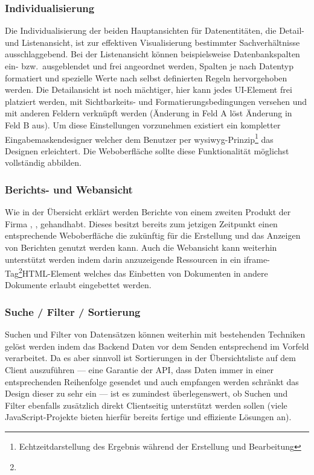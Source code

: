\subsubsection{Individualisierung}
Die Individualisierung der beiden Hauptansichten für Datenentitäten, die Detail- und Listenansicht, ist zur effektiven Visualisierung bestimmter Sachverhältnisse ausschlaggebend. Bei der Listenansicht können beispielsweise Datenbankspalten ein- bzw.\ ausgeblendet und frei angeordnet werden, Spalten je nach Datentyp formatiert und spezielle Werte nach selbst definierten Regeln hervorgehoben werden. Die Detailansicht ist noch mächtiger, hier kann jedes UI-Element frei platziert werden, mit Sichtbarkeits- und Formatierungsbedingungen versehen und mit anderen Feldern verknüpft werden (Änderung in Feld A löst Änderung in Feld B aus). Um diese Einstellungen vorzunehmen existiert ein kompletter Eingabemaskendesigner welcher dem Benutzer per \gls{wysiwyg}-Prinzip\footnote{Echtzeitdarstellung des Ergebnis während der Erstellung und Bearbeitung} das Designen erleichtert.
Die Weboberfläche sollte diese Funktionalität möglichst vollständig abbilden.

\subsubsection{Berichts- und Webansicht}
Wie in der Übersicht erklärt werden Berichte von einem zweiten Produkt der Firma , , gehandhabt. Dieses besitzt bereits zum jetzigen Zeitpunkt einen entsprechende Weboberfläche die zukünftig für die Erstellung und das Anzeigen von Berichten genutzt werden kann. 
Auch die Webansicht kann weiterhin unterstützt werden indem darin anzuzeigende Ressourcen in ein iframe-Tag\footnote{}{HTML-Element welches das Einbetten von Dokumenten in andere Dokumente erlaubt} eingebettet werden.

\subsubsection{Suche / Filter / Sortierung}
Suchen und Filter von Datensätzen können weiterhin mit bestehenden Techniken gelöst werden indem das Backend Daten vor dem Senden entsprechend im Vorfeld verarbeitet. Da es aber sinnvoll ist Sortierungen in der Übersichtsliste auf dem Client auszuführen --- eine Garantie der API, dass Daten immer in einer entsprechenden Reihenfolge gesendet und auch empfangen werden schränkt das Design dieser zu sehr ein --- ist es zumindest überlegenswert, ob Suchen und Filter ebenfalls zusätzlich direkt Clientseitig unterstützt werden sollen (viele JavaScript-Projekte bieten hierfür bereits fertige und effiziente Lösungen an).

